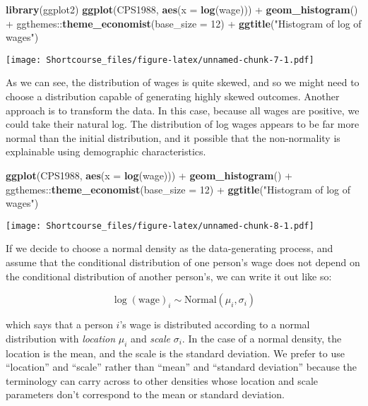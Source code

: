 \documentclass[]{book}
\newenvironment{Shaded}{\begin{snugshade}}{\end{snugshade}}
\newcommand{\KeywordTok}[1]{\textcolor[rgb]{0.13,0.29,0.53}{\textbf{{#1}}}}
\newcommand{\DataTypeTok}[1]{\textcolor[rgb]{0.13,0.29,0.53}{{#1}}}
\newcommand{\DecValTok}[1]{\textcolor[rgb]{0.00,0.00,0.81}{{#1}}}
\newcommand{\StringTok}[1]{\textcolor[rgb]{0.31,0.60,0.02}{{#1}}}
\newcommand{\NormalTok}[1]{{#1}}
\begin{document}
\begin{Shaded}
\begin{Highlighting}[]
\KeywordTok{library}\NormalTok{(ggplot2)}
\KeywordTok{ggplot}\NormalTok{(CPS1988, }\KeywordTok{aes}\NormalTok{(}\DataTypeTok{x =} \KeywordTok{log}\NormalTok{(wage))) +}
\StringTok{  }\KeywordTok{geom_histogram}\NormalTok{() +}\StringTok{ }
\StringTok{  }\NormalTok{ggthemes::}\KeywordTok{theme_economist}\NormalTok{(}\DataTypeTok{base_size =} \DecValTok{12}\NormalTok{) +}
\StringTok{  }\KeywordTok{ggtitle}\NormalTok{(}\StringTok{"Histogram of log of wages"}\NormalTok{)}
\end{Highlighting}
\end{Shaded}

\texttt{[image: Shortcourse\_files/figure-latex/unnamed-chunk-7-1.pdf]}

As we can see, the distribution of wages is quite skewed, and so we
might need to choose a distribution capable of generating highly skewed
outcomes. Another approach is to transform the data. In this case,
because all wages are positive, we could take their natural log. The
distribution of log wages appears to be far more normal than the initial
distribution, and it possible that the non-normality is explainable
using demographic characteristics.

\begin{Shaded}
\begin{Highlighting}[]
\KeywordTok{ggplot}\NormalTok{(CPS1988, }\KeywordTok{aes}\NormalTok{(}\DataTypeTok{x =} \KeywordTok{log}\NormalTok{(wage))) +}
\StringTok{  }\KeywordTok{geom_histogram}\NormalTok{() +}\StringTok{ }
\StringTok{  }\NormalTok{ggthemes::}\KeywordTok{theme_economist}\NormalTok{(}\DataTypeTok{base_size =} \DecValTok{12}\NormalTok{) +}
\StringTok{  }\KeywordTok{ggtitle}\NormalTok{(}\StringTok{"Histogram of log of wages"}\NormalTok{)}
\end{Highlighting}
\end{Shaded}

\texttt{[image: Shortcourse\_files/figure-latex/unnamed-chunk-8-1.pdf]}

If we decide to choose a normal density as the data-generating process,
and assume that the conditional distribution of one person's wage does
not depend on the conditional distribution of another person's, we can
write it out like so:

\[
\log(\mbox{wage})_{i} \sim \mbox{Normal}(\mu_{i}, \sigma_{i})
\]

which says that a person \(i\)'s wage is distributed according to a
normal distribution with \emph{location} \(\mu_{i}\) and \emph{scale}
\(\sigma_{i}\). In the case of a normal density, the location is the
mean, and the scale is the standard deviation. We prefer to use
``location'' and ``scale'' rather than ``mean'' and ``standard
deviation'' because the terminology can carry across to other densities
whose location and scale parameters don't correspond to the mean or
standard deviation.
\end{document}
